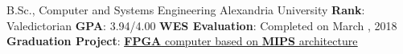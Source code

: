 \documentclass[letterpaper]{twentysecondcv} %
\newcommand{\myhy}[2]{\underline{\href{#1}{#2}}}
\begin{document}
\begin{twenty} %
               {B.Sc., Computer and Systems Engineering}
               {Alexandria University}
               {\textbf{Rank}: Valedictorian\newline
                \textbf{GPA}: 3.94/4.00\newline
                \textbf{WES Evaluation}: Completed on March , 2018\newline
                \textbf{Graduation Project}: \myhy{https://github.com/iocoder/graduation}
                                             {\textbf{FPGA} computer based on \textbf{MIPS} architecture}
               }
\end{twenty}



\end{document}
